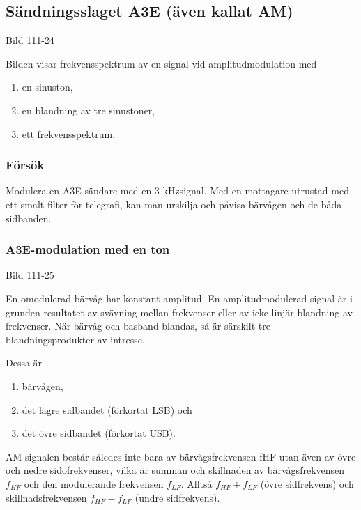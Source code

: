 \subsection{Sändningsslaget A3E (även kallat AM)}

Bild 111-24

Bilden visar frekvensspektrum av en signal vid amplitudmodulation med

\begin{enumerate}[label=\alph*.,noitemsep]
\item en sinuston,
\item en blandning av tre sinustoner,
\item ett frekvensspektrum.
\end{enumerate}

\subsubsection{Försök}

Modulera en A3E-sändare med en 3 kHzsignal. Med en mottagare utrustad med ett
smalt filter för telegrafi, kan man urskilja och påvisa bärvågen och de båda sidbanden.

\subsubsection{A3E-modulation med en ton}

Bild 111-25

En omodulerad bärvåg har konstant amplitud. En amplitudmodulerad signal är i grunden
resultatet av svävning mellan frekvenser eller av icke linjär blandning av frekvenser. När 
bärvåg och basband blandas, så är särskilt tre blandningsprodukter av intresse.

Dessa är

\begin{enumerate}[label=-,noitemsep]
\item bärvågen,
\item det lägre sidbandet (förkortat LSB) och
\item det övre sidbandet (förkortat USB).
\end{enumerate}

AM-signalen består således inte bara av bärvågsfrekvensen fHF utan även av övre
och nedre sidofrekvenser, vilka är summan och skillnaden av bärvågsfrekvensen \(f_{HF}\) och
den modulerande frekvensen \(f_{LF}\). Alltså \(f_{HF} + f_{LF}\) (övre sidfrekvens) och
skillnadsfrekvensen \(f_{HF} - f_{LF}\) (undre sidfrekvens).

